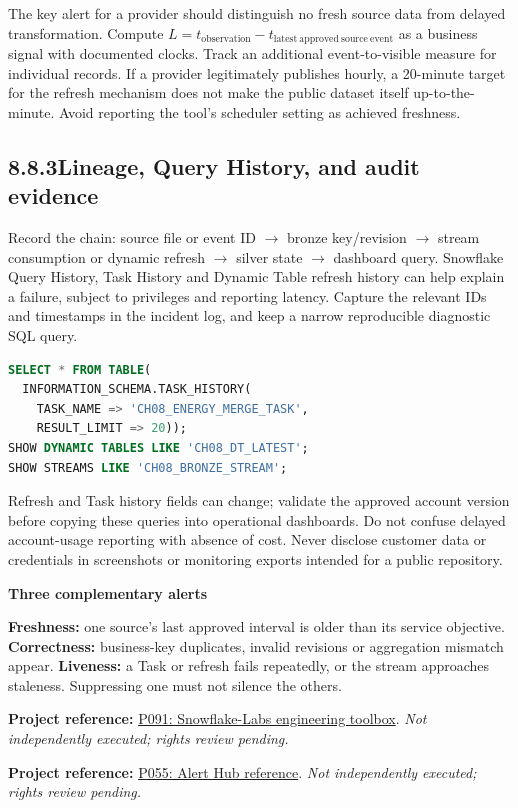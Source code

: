 \documentclass[11pt,twoside]{article}
\newcommand{\topic}[2]{\subsection*{#1\quad #2}}
\newcommand{\repo}[2]{\par\begingroup\fontsize{8.0}{9.6}\selectfont\sffamily\color{inkgray}\textbf{Project reference:} \href{#2}{#1}. \textit{Not independently executed; rights review pending.}\par\endgroup}
\begin{document}
The key alert for a provider should distinguish no fresh source data from delayed transformation. Compute \(L=t_{\mathrm{observation}}-t_{\mathrm{latest\ approved\ source\ event}}\) as a business signal with documented clocks. Track an additional event-to-visible measure for individual records. If a provider legitimately publishes hourly, a 20-minute target for the refresh mechanism does not make the public dataset itself up-to-the-minute. Avoid reporting the tool's scheduler setting as achieved freshness.
\topic{8.8.3}{Lineage, Query History, and audit evidence}
Record the chain: source file or event ID \(\rightarrow\) bronze key/revision \(\rightarrow\) stream consumption or dynamic refresh \(\rightarrow\) silver state \(\rightarrow\) dashboard query. Snowflake Query History, Task History and Dynamic Table refresh history can help explain a failure, subject to privileges and reporting latency. Capture the relevant IDs and timestamps in the incident log, and keep a narrow reproducible diagnostic SQL query.
\begin{lstlisting}[language=SQL,caption={Illustrative history inspections; permission requirements apply.}]
SELECT * FROM TABLE(
  INFORMATION_SCHEMA.TASK_HISTORY(
    TASK_NAME => 'CH08_ENERGY_MERGE_TASK',
    RESULT_LIMIT => 20));
SHOW DYNAMIC TABLES LIKE 'CH08_DT_LATEST';
SHOW STREAMS LIKE 'CH08_BRONZE_STREAM';
\end{lstlisting}
Refresh and Task history fields can change; validate the approved account version before copying these queries into operational dashboards. Do not confuse delayed account-usage reporting with absence of cost. Never disclose customer data or credentials in screenshots or monitoring exports intended for a public repository.
\begin{whitebox}\textbf{Three complementary alerts}\par
\textbf{Freshness:} one source's last approved interval is older than its service objective. \textbf{Correctness:} business-key duplicates, invalid revisions or aggregation mismatch appear. \textbf{Liveness:} a Task or refresh fails repeatedly, or the stream approaches staleness. Suppressing one must not silence the others.\end{whitebox}
\repo{P091: Snowflake-Labs engineering toolbox}{https://github.com/Snowflake-Labs/emerging-solutions-toolbox}
\repo{P055: Alert Hub reference}{https://github.com/Snowflake-Labs/sfguide-alert-hub}
\newpage
\end{document}
